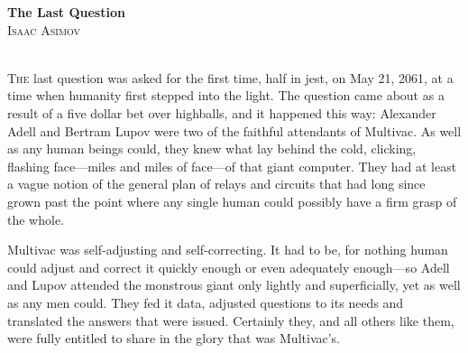 \documentclass[11pt,twocolumn,paper=a5,pagesize,twoside]{scrartcl}
\newcommand{\specialinitiala}[1]{
\lettrine[lines=3,lhang=0.21,nindent=0em]{  
\textsf{#1}}}
\begin{document}




\thispagestyle{empty}
\vspace*{2cm}



\newpage
\setcounter{page}{1}

{\parindent0mm  \textbf{The Last Question}\\
	\textsc{Isaac Asimov}\\
}
\ \\



\pagebreak


\specialinitiala{T}{he} last question was asked for the first time, half in jest, on May 21, 
2061, at a time when humanity first stepped into the light. The question
came about as a result of a five dollar bet over highballs, and it happened
this way:
Alexander Adell and Bertram Lupov were two of the faithful attendants of 
Multivac. As well as any human beings could, they knew what lay behind the 
cold, clicking, flashing face---miles and miles of face---of that giant
computer. They had at least a vague notion of the general plan of relays 
and circuits that had long since grown past the point where any single 
human could possibly have a firm grasp of the whole.

Multivac was self-adjusting and self-correcting. It had to be, for nothing 
human could adjust and correct it quickly enough or even adequately 
enough---so Adell and Lupov attended the monstrous giant only lightly and 
superficially, yet as well as any men could. They fed it data, adjusted 
questions to its needs and translated the answers that were issued. 
Certainly they, and all others like them, were fully entitled to share 
in the glory that was Multivac's.
\end{document}
